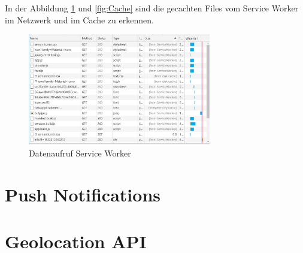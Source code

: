 In der Abbildung \ref{fig:aufrufSWBrowser} und \ref{fig:Cache} sind die gecachten Files vom Service Worker im Netzwerk und im Cache zu erkennen.

\begin{figure}[h]
	\centering
	\includegraphics[width=8cm]{BilderAllgemein/Implementierung/aufruf_SW_Browser.jpg}\medskip
	\caption{Datenaufruf Service Worker}
	\label{fig:aufrufSWBrowser}
\end{figure}

\section{Push Notifications}


\section{Geolocation API}











